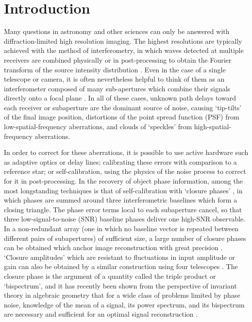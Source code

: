 \documentclass[modern]{aastex63}
\begin{document}
\section{Introduction} 
\label{sec:intro}
Many questions in astronomy and other sciences can only be answered with diffraction-limited high resolution imaging. The highest resolutions are typically achieved with the method of interferometry, in which waves detected at multiple receivers are combined physically or in post-processing to obtain the Fourier transform of the source intensity distribution \citep{vc34,zernike38}. Even in the case of a single telescope or camera, it is often nevertheless helpful to think of them as an interferometer composed of many sub-apertures which combine their signals directly onto a focal plane \citep[a `Fizeau interferometer':][]{fizeau1868}. In all of these cases, unknown path delays toward each receiver or subaperture are the dominant source of noise, causing `tip-tilts' of the final image position, distortions of the point spread function (PSF) from low-spatial-frequency aberrations, and clouds of `speckles' from high-spatial-frequency aberrations.

In order to correct for these aberrations, it is possible to use active hardware such as adaptive optics or delay lines; calibrating these errors with comparison to a reference star; or self-calibration, using the physics of the noise process to correct for it in post-processing.
In the recovery of object phase information, among the most longstanding techniques is that of self-calibration with `closure phases' \citep[introduced in the context of radio astronomy by][]{jennison58}, in which phases are summed around three interferometric baselines which form a closing triangle. The phase error terms local to each subaperture cancel, so that three low-signal-to-noise (SNR) baseline phases deliver one high-SNR observable. In a non-redundant array (one in which no baseline vector is repeated between different pairs of subapertures) of sufficient size, a large number of closure phases can be obtained which anchor image reconstruction with great precision \citep{chael18}. `Closure amplitudes' which are resistant to fluctuations in input amplitude or gain can also be obtained by a similar construction using four telescopes \citep{twiss60,blackburn20}. The closure phase is the argument of a quantity called the triple product or `bispectrum', and it has recently been shown from the perspective of invariant theory in algebraic geometry that for a wide class of problems limited by phase noise, knowledge of the mean of a signal, its power spectrum, and its bispectrum are necessary and sufficient for an optimal signal reconstruction \citep{bandeira17}.
\end{document}
